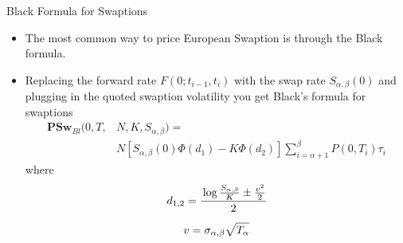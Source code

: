 \documentclass{beamer}
\begin{document}
\begin{frame}{Black Formula for Swaptions}
	\begin{itemize}
		\item The most common way to price European Swaption is through the Black formula.
		\item Replacing the forward rate $F(0;t_{i-1},t_i)$ with the swap rate $S_{\alpha,\beta}(0)$ and plugging in the quoted swaption volatility you get Black's formula for swaptions
		\begin{equation}
			\boxed{\begin{aligned}
					\textbf{PSw}_{Bl}(0,T,&N,K,S_{\alpha,\beta})=\\
					&N\left[S_{\alpha,\beta}(0)\Phi(d_1)-K\Phi(d_2)\right]\sum_{i=\alpha+1}^\beta P(0,T_i)\tau_i
			\end{aligned}}
		\end{equation}
		where
		\begin{equation*}
			\begin{gathered}
				d_{1,2} = \cfrac{\log{\frac{S_{\alpha,\beta}}{K}} \pm \frac{v^2}{2}}{2}\\[0.2cm] 
				v = \sigma_{\alpha,\beta}\sqrt{T_\alpha}
			\end{gathered}
		\end{equation*}
	\end{itemize}
\end{frame}
\end{document}

